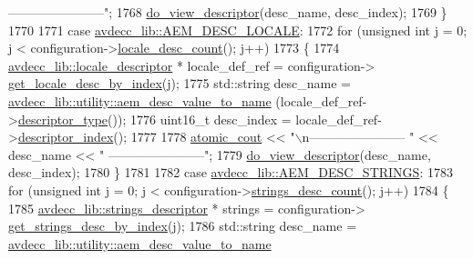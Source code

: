 \begin{DoxyCode}
{       -----------------------"};
1768             \hyperlink{classcmd__line_aef7d9f8c4eff85c46e5b7aea0961bb51}{do\_view\_descriptor}(desc\_name, desc\_index);
1769         \}
1770 
1771     \textcolor{keywordflow}{case} \hyperlink{namespaceavdecc__lib_ac7b7d227e46bc72b63ee9e9aae15902fafe9b509497773b71583f43c1de58e3e5}{avdecc\_lib::AEM\_DESC\_LOCALE}:
1772         \textcolor{keywordflow}{for} (\textcolor{keywordtype}{unsigned} \textcolor{keywordtype}{int} j = 0; j < configuration->\hyperlink{classavdecc__lib_1_1configuration__descriptor_ab677ec4987bcd55bfcfa0e524b6f78f6}{locale\_desc\_count}(); j++)
1773         \{
1774             \hyperlink{classavdecc__lib_1_1locale__descriptor}{avdecc\_lib::locale\_descriptor} * locale\_def\_ref = configuration->
      \hyperlink{classavdecc__lib_1_1configuration__descriptor_a7d32e35d54b0dfaa2e99318315029269}{get\_locale\_desc\_by\_index}(j);
1775             std::string desc\_name = \hyperlink{namespaceavdecc__lib_1_1utility_a6bdd02679e5a911a071d4aa03be341f0}{avdecc\_lib::utility::aem\_desc\_value\_to\_name}
      (locale\_def\_ref->\hyperlink{classavdecc__lib_1_1descriptor__base_a5112b70022171063ec5d3242bee9910e}{descriptor\_type}());
1776             uint16\_t desc\_index = locale\_def\_ref->\hyperlink{classavdecc__lib_1_1descriptor__base_a7eed5583bffdf72d89021b188648c1b5}{descriptor\_index}();
1777 
1778             \hyperlink{cmd__line_8h_a0bc38ccc65c79ba06c6fcd7b4bf554c3}{atomic\_cout} << \textcolor{stringliteral}{"\(\backslash\)n----------------------- "} << desc\_name << \textcolor{stringliteral}{"
       -----------------------"};
1779             \hyperlink{classcmd__line_aef7d9f8c4eff85c46e5b7aea0961bb51}{do\_view\_descriptor}(desc\_name, desc\_index);
1780         \}
1781 
1782     \textcolor{keywordflow}{case} \hyperlink{namespaceavdecc__lib_ac7b7d227e46bc72b63ee9e9aae15902fa526663b7fb24c091547f86797eec03e0}{avdecc\_lib::AEM\_DESC\_STRINGS}:
1783         \textcolor{keywordflow}{for} (\textcolor{keywordtype}{unsigned} \textcolor{keywordtype}{int} j = 0; j < configuration->\hyperlink{classavdecc__lib_1_1configuration__descriptor_a15e2737b1998af8123e888697dc62859}{strings\_desc\_count}(); j++)
1784         \{
1785             \hyperlink{classavdecc__lib_1_1strings__descriptor}{avdecc\_lib::strings\_descriptor} * strings = configuration->
      \hyperlink{classavdecc__lib_1_1configuration__descriptor_a34531c290e12e85895a804c067e9919e}{get\_strings\_desc\_by\_index}(j);
1786             std::string desc\_name = \hyperlink{namespaceavdecc__lib_1_1utility_a6bdd02679e5a911a071d4aa03be341f0}{avdecc\_lib::utility::aem\_desc\_value\_to\_name}

\end{DoxyCode}
